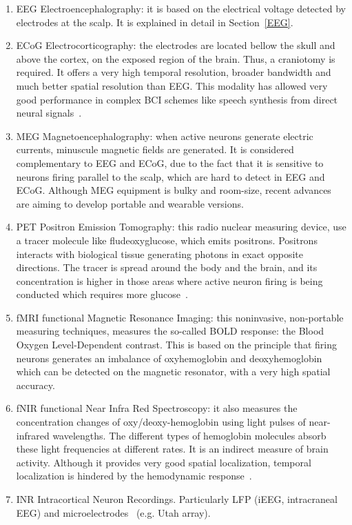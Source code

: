 \begin{enumerate}
\item EEG Electroencephalography: it is based on the electrical voltage detected by electrodes at the scalp.  It is explained in detail in Section~\ref{EEG}.
\item ECoG Electrocorticography: the electrodes are located bellow the skull and above the cortex, on the exposed region of the brain. Thus, a craniotomy is required.  It offers a very high temporal resolution, broader bandwidth and much better spatial resolution than EEG.  This modality has allowed very good performance in complex BCI schemes like speech synthesis from direct neural signals~\cite{Herff2016}.
\item MEG Magnetoencephalography: when active neurons generate electric currents, minuscule magnetic fields are generated.  It is considered complementary to EEG and ECoG, due to the fact that it is sensitive to neurons firing parallel to the scalp, which are hard to detect in EEG and ECoG.   Although MEG equipment is bulky and room-size, recent advances~\cite{Boto2018} are aiming to develop portable and wearable versions. 
\item PET Positron Emission Tomography: this radio nuclear measuring device, use a tracer molecule like fludeoxyglucose, which emits positrons.  Positrons interacts with biological tissue generating photons in exact opposite directions.  The tracer is spread around the body and the brain, and its concentration is higher in those areas where active neuron firing is being conducted which requires more glucose~\cite{Nam2010}. 
\item fMRI  functional Magnetic Resonance Imaging: this noninvasive, non-portable measuring techniques, measures the so-called BOLD response: the Blood Oxygen Level-Dependent contrast.  This is based on the principle that firing neurons generates an imbalance of oxyhemoglobin and deoxyhemoglobin which can be detected on the magnetic resonator, with a very high spatial accuracy.
\item fNIR  functional Near Infra Red Spectroscopy:  it also measures the concentration changes of oxy/deoxy-hemoglobin using light pulses of near-infrared wavelengths.  The different types of hemoglobin molecules absorb these light frequencies at different rates.  It is an indirect measure of brain activity.  Although it provides very good spatial localization, temporal localization is hindered by the hemodynamic response~\cite{Nam2010}.
\item INR Intracortical Neuron Recordings.  Particularly LFP (iEEG, intracraneal EEG\cite{Buzsaki2012}) and microelectrodes~\cite{Ajiboye2017} (e.g. Utah array).
\end{enumerate}


